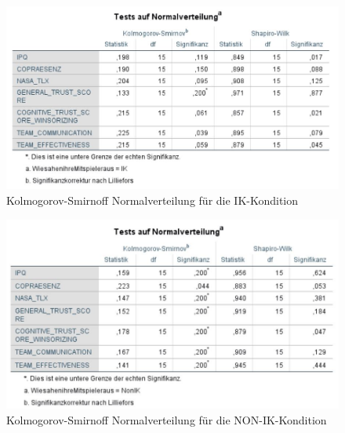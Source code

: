\documentclass[a4paper,11pt]{article}%
\renewcommand{\\}{\vspace*{0.5\baselineskip} \newline}
\begin{document}
	\begin{figure}[H]
	\centering
		\begin{footnotesize}
			\includegraphics[scale=0.6]{Abbildungen/Post_QuestionnaireStatistiks/Normalverteilung_15_IK}\\
			\caption{Kolmogorov-Smirnoff Normalverteilung für die IK-Kondition}
			\label{fig:KolSmirIndIK}
		\end{footnotesize}
	\end{figure}	
	
	\begin{figure}[H]
	\centering
		\begin{footnotesize}
			\includegraphics[scale=0.6]{Abbildungen/Post_QuestionnaireStatistiks/Normalverteilung_15_NON_IK}\\
			\caption{Kolmogorov-Smirnoff Normalverteilung für die NON-IK-Kondition}
			\label{fig:KolSmirIndNONIK}
		\end{footnotesize}
	\end{figure}	
	
\end{document}
